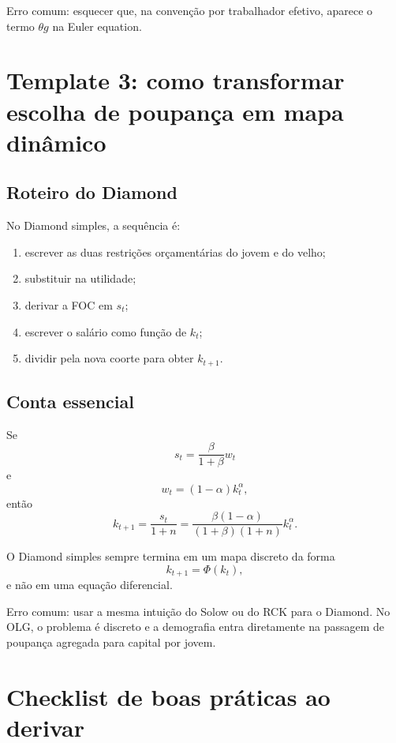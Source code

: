 \documentclass[11pt,a4paper]{article}
\begin{document}
\begin{armadilha}
Erro comum: esquecer que, na conven\c{c}\~ao por trabalhador efetivo, aparece o
termo \(\theta g\) na Euler equation.
\end{armadilha}

\section{Template 3: como transformar escolha de poupan\c{c}a em mapa din\^amico}

\subsection{Roteiro do Diamond}

No Diamond simples, a sequ\^encia \'e:
\begin{enumerate}
  \item escrever as duas restri\c{c}\~oes or\c{c}ament\'arias do jovem e do velho;
  \item substituir na utilidade;
  \item derivar a FOC em \(s_t\);
  \item escrever o sal\'ario como fun\c{c}\~ao de \(k_t\);
  \item dividir pela nova coorte para obter \(k_{t+1}\).
\end{enumerate}

\subsection{Conta essencial}

Se
\[
s_t=\frac{\beta}{1+\beta}w_t
\]
e
\[
w_t=(1-\alpha)k_t^\alpha,
\]
ent\~ao
\[
k_{t+1}
=
\frac{s_t}{1+n}
=
\frac{\beta(1-\alpha)}{(1+\beta)(1+n)}k_t^\alpha.
\]

\begin{resultado}
O Diamond simples sempre termina em um mapa discreto da forma
\[
k_{t+1}=\Phi(k_t),
\]
e n\~ao em uma equa\c{c}\~ao diferencial.
\end{resultado}

\begin{armadilha}
Erro comum: usar a mesma intui\c{c}\~ao do Solow ou do RCK para o Diamond. No
OLG, o problema \'e discreto e a demografia entra diretamente na passagem de
poupan\c{c}a agregada para capital por jovem.
\end{armadilha}

\section{Checklist de boas pr\'aticas ao derivar}
\end{document}
